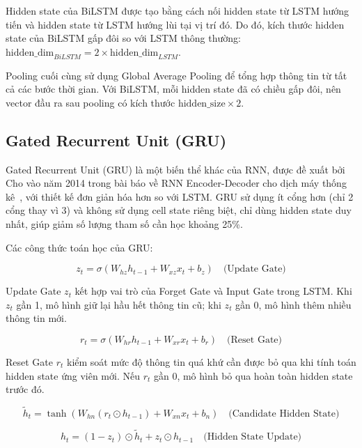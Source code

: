 \documentclass[../BTL.tex]{subfiles}
\begin{document}
Hidden state của BiLSTM được tạo bằng cách nối hidden state từ LSTM hướng tiến và hidden state từ LSTM hướng lùi tại vị trí đó. Do đó, kích thước hidden state của BiLSTM gấp đôi so với LSTM thông thường: $\text{hidden\_dim}_{BiLSTM} = 2 \times \text{hidden\_dim}_{LSTM}$.

Pooling cuối cùng sử dụng Global Average Pooling để tổng hợp thông tin từ tất cả các bước thời gian. Với BiLSTM, mỗi hidden state đã có chiều gấp đôi, nên vector đầu ra sau pooling có kích thước $\text{hidden\_size} \times 2$.

\subsection{Gated Recurrent Unit (GRU)}
Gated Recurrent Unit (GRU) là một biến thể khác của RNN, được đề xuất bởi Cho vào năm 2014 trong bài báo về RNN Encoder-Decoder cho dịch máy thống kê~\cite{cho2014gru}, với thiết kế đơn giản hóa hơn so với LSTM. GRU sử dụng ít cổng hơn (chỉ 2 cổng thay vì 3) và không sử dụng cell state riêng biệt, chỉ dùng hidden state duy nhất, giúp giảm số lượng tham số cần học khoảng 25\%.

Các công thức toán học của GRU:

\begin{equation}
    z_t = \sigma(W_{hz} h_{t-1} + W_{xz} x_t + b_z) \quad \text{(Update Gate)}
\end{equation}

Update Gate $z_t$ kết hợp vai trò của Forget Gate và Input Gate trong LSTM. Khi $z_t$ gần 1, mô hình giữ lại hầu hết thông tin cũ; khi $z_t$ gần 0, mô hình thêm nhiều thông tin mới.

\begin{equation}
    r_t = \sigma(W_{hr} h_{t-1} + W_{xr} x_t + b_r) \quad \text{(Reset Gate)}
\end{equation}

Reset Gate $r_t$ kiểm soát mức độ thông tin quá khứ cần được bỏ qua khi tính toán hidden state ứng viên mới. Nếu $r_t$ gần 0, mô hình bỏ qua hoàn toàn hidden state trước đó.

\begin{equation}
    \tilde{h}_t = \tanh(W_{hn}(r_t \odot h_{t-1}) + W_{xn} x_t + b_n) \quad \text{(Candidate Hidden State)}
\end{equation}

\begin{equation}
    h_t = (1 - z_t) \odot \tilde{h}_t + z_t \odot h_{t-1} \quad \text{(Hidden State Update)}
\end{equation}
\end{document}

